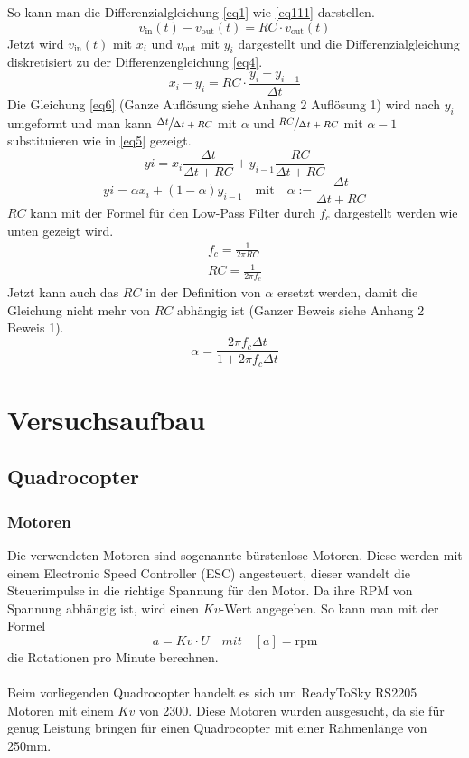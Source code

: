 \documentclass[12pt,a4paper, ngerman]{article}
\begin{document}
So kann man die Differenzialgleichung \ref{eq1} wie \ref{eq111} darstellen.\\
\begin{equation} \label{eq111}
v_{\text{in}}(t)-v_{\text{out}}(t)=RC\cdot \dot{v}_{\text{out}}(t)
\end{equation}
Jetzt wird $v_{\text{in}}(t)$ mit $x_{i}$ und $v_{\text{out}}$ mit $y_{i}$ dargestellt und die Differenzialgleichung diskretisiert zu der Differenzengleichung \ref{eq4}.
\begin{equation}\label{eq4}
x_{i}-y_{i}=RC\cdot \frac{y_{i}-y_{i-1}}{\Delta t}
\end{equation}
\newpage
\noindent
Die Gleichung \ref{eq6} (Ganze Auflösung siehe Anhang 2 Auflösung 1) wird nach $y_{i}$ umgeformt und man kann $\sfrac{\Delta t}{\Delta t+RC}$  mit $\alpha$ und $\sfrac{RC}{\Delta t + RC}$ mit $\alpha-1$ substituieren wie in \ref{eq5} gezeigt.
\begin{equation} \label{eq6}
y{i}=x_{i}\frac{\Delta t}{\Delta t+RC} + y_{i-1}\frac{RC}{\Delta t+RC}
\end{equation} 
\begin{equation}\label{eq5}
y{i}=\alpha x_{i} + (1-\alpha)y_{i-1} \quad \text{mit} \quad \alpha:=\frac{\Delta t}{\Delta t+RC}
\end{equation}
$RC$ kann mit der Formel für den Low-Pass Filter durch $f_{c}$ dargestellt werden wie unten gezeigt wird.
\begin{align*}
f_{c} = \frac{1}{2\pi RC} \\
RC = \frac{1}{2\pi f_{c}} 
\end{align*}
Jetzt kann auch das $RC$ in der Definition von $\alpha$ ersetzt werden, damit die Gleichung nicht mehr von $RC$ abhängig ist (Ganzer Beweis siehe Anhang 2 Beweis 1).
\begin{equation*}
\alpha = \frac{2\pi f_{c}\Delta t}{1+2\pi f_{c}\Delta t} 
\end{equation*}
\newpage
\section{Versuchsaufbau}
\subsection{Quadrocopter}
\subsubsection{Motoren}
Die verwendeten Motoren sind sogenannte bürstenlose Motoren. Diese werden mit einem Electronic Speed Controller (ESC) angesteuert, dieser wandelt die Steuerimpulse in die richtige Spannung für den Motor. Da ihre RPM von Spannung abhängig ist, wird einen $Kv$-Wert angegeben. So kann man mit der Formel
\begin{equation}
a=Kv\cdot U \quad mit \quad [a]=\text{rpm}
\end{equation}
die Rotationen pro Minute berechnen.\\ \\
Beim vorliegenden Quadrocopter handelt es sich um ReadyToSky RS2205 Motoren mit einem $Kv$ von 2300. Diese Motoren wurden ausgesucht, da sie für genug Leistung bringen für einen Quadrocopter mit einer Rahmenlänge von 250mm.
\end{document}
